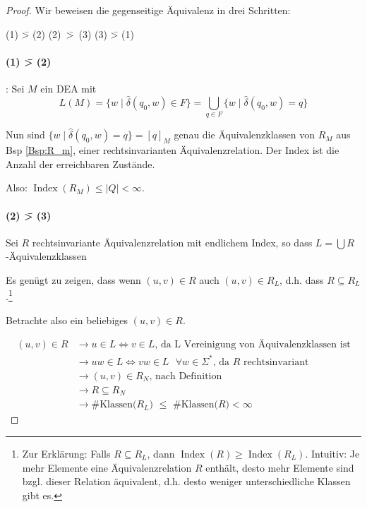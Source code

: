 \begin{proof}
  Wir beweisen die gegenseitige Äquivalenz in drei Schritten:

  \begin{center}
    (1) \=> (2) \quad \mbox{(2) \=> (3)} \quad (3) \=> (1)
  \end{center}

        \paragraph{(1) \=> (2)}: Sei $M$ ein \ac{DEA} mit
  \begin{displaymath}
    L(M)=\{w \mid \hat\delta(q_0,w)\in F \} = \bigcup_{q \in F} \{ w \mid \hat\delta(q_0,w) = q\}
\end{displaymath}

Nun sind $\{ w \mid \hat\delta(q_0,w)=q \} = [q]_M$ genau die Äquivalenzklassen von $R_M$ aus Bsp \ref{Bsp:R_m}, einer rechtsinvarianten Äquivalenzrelation.
Der Index ist die Anzahl der erreichbaren Zustände.

Also: $\operatorname{Index}(R_M) \le |Q| < \infty$.
        
\paragraph{(2) \=> (3)} Sei $R$ rechtsinvariante Äquivalenzrelation mit endlichem Index, so dass $L=\bigcup R$-Äquivalenzklassen
        
Es genügt zu zeigen, dass wenn $(u,v)\in R$ auch $(u,v)\in R_L $, d.h. dass $R \subseteq R_L$.\footnote{
Zur Erklärung: Falls $R \subseteq R_L$, dann $\operatorname{Index}(R) \ge \operatorname{Index}(R_L)$.
Intuitiv: Je mehr Elemente eine Äquivalenzrelation $R$ enthält, desto mehr Elemente sind bzgl. dieser Relation äquivalent, d.h. desto weniger unterschiedliche Klassen gibt es.}

Betrachte also ein beliebiges $(u, v) \in R$.

\begin{align*}
(u, v) \in R & \rightarrow u \in L \Leftrightarrow v \in L \text{, da L Vereinigung von Äquivalenzklassen ist} \\
& \rightarrow uw \in L \Leftrightarrow vw \in L \text{ $\forall w \in \Sigma^*$, da $R$ rechtsinvariant } \\
& \rightarrow (u, v) \in R_N \text{, nach Definition}\\
& \rightarrow R \subseteq R_N \\
& \rightarrow \text{\#Klassen($R_L$) $\leq$ \#Klassen($R$)}<\infty
\end{align*}



\end{proof}
